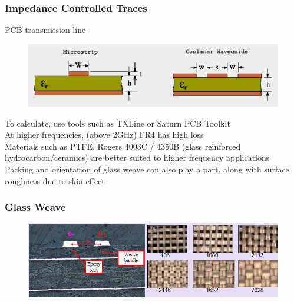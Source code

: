\documentclass[t]{beamer}
\begin{document}
\begin{frame}
\frametitle{Impedance Controlled Traces}
PCB transmission line\\
\begin{figure}
	\includegraphics[width=0.8\linewidth]{microstrip.jpg}
\end{figure}
To calculate, use tools such as TXLine or Saturn PCB Toolkit\\
\vspace{2mm}
At higher frequencies, (above 2GHz) FR4 has high loss\\
Materials such as PTFE, Rogers 4003C / 4350B (glass reinforced hydrocarbon/ceramics) are better suited to higher frequency applications \\
Packing and orientation of glass weave can also play a part, along with surface roughness due to skin effect 
\end{frame}
\begin{frame}
	\frametitle{Glass Weave}
	\begin{figure}
		\includegraphics[width=\linewidth]{glassWeave.jpg}
	\end{figure}
\end{frame}
\end{document}
